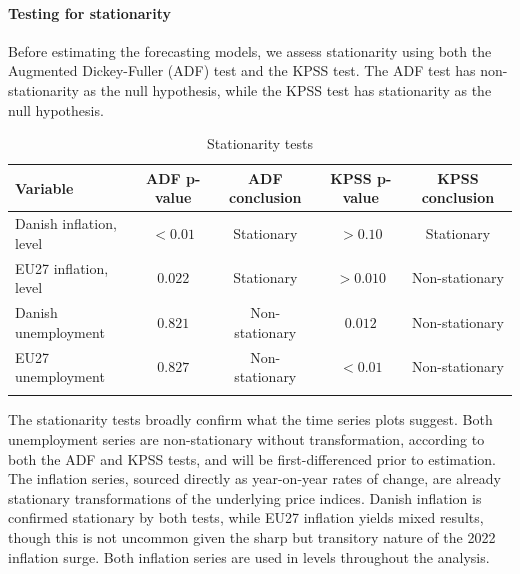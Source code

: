 
\paragraph{Testing for stationarity}

Before estimating the forecasting models, we assess stationarity using both the Augmented Dickey-Fuller (ADF) test and the KPSS test. The ADF test has non-stationarity as the null hypothesis, while the KPSS test has stationarity as the null hypothesis.



\begin{table}[H]
\centering
\small{
\caption{Stationarity tests}
\begin{tabular*}{\textwidth}{@{\extracolsep{\fill}}lcccc}
\hline \hline
\rule{0pt}{12pt}\textbf{Variable} & \textbf{ADF p-value} & \textbf{ADF conclusion} & \textbf{KPSS p-value} & \textbf{KPSS conclusion} \\ [3pt]
\hline
\rule{0pt}{12pt}Danish inflation, level      & $<0.01$ & Stationary     & $>0.10$ & Stationary     \\ [3pt]
\rule{0pt}{12pt}EU27 inflation, level        & $0.022$ & Stationary     & $>0.010$ & Non-stationary \\[3pt]
\rule{0pt}{12pt}Danish unemployment   & $0.821$ & Non-stationary & $0.012$ & Non-stationary \\[3pt]
\rule{0pt}{12pt}EU27 unemployment     & $0.827$ & Non-stationary & $<0.01$ & Non-stationary \\[3pt]
\hline \hline
\label{tab:stationarity_levels}
\end{tabular*}
}
\end{table}
The stationarity tests broadly confirm what the time series plots suggest. Both unemployment series are non-stationary without transformation, according to both the ADF and KPSS tests, and will be first-differenced prior to estimation. The inflation series, sourced directly as year-on-year rates of change, are already stationary transformations of the underlying price indices. Danish inflation is confirmed stationary by both tests, while EU27 inflation yields mixed results, though this is not uncommon given the sharp but transitory nature of the 2022 inflation surge. Both inflation series are used in levels throughout the analysis.







